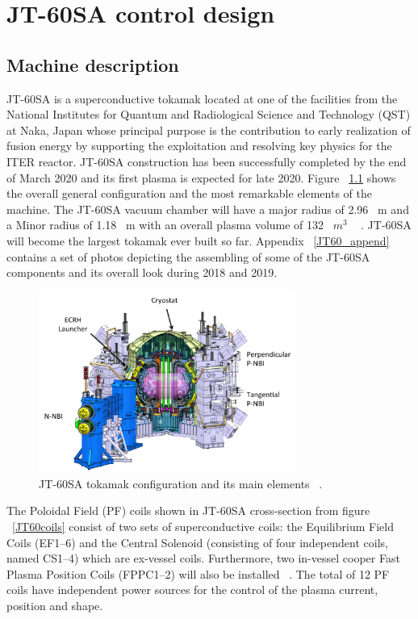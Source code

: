 \chapter{JT-60SA control design}

\section{Machine description}

JT-60SA is a superconductive tokamak located at one of the facilities from the National Institutes for Quantum and Radiological Science and Technology (QST)  at  Naka, Japan whose principal purpose is  the contribution to early realization of fusion energy by supporting the exploitation and resolving key physics for the ITER reactor.  JT-60SA construction has been successfully completed by the end of March 2020 and its first plasma is expected for late 2020. Figure ~\ref{JT60schm} shows the overall general configuration and the most remarkable elements of the machine. The JT-60SA  vacuum chamber will have a major radius of 2.96~ m and a Minor radius of 1.18~ m with an overall plasma volume of 132~ $m^3$ ~\cite{Spears2014} . JT-60SA will become the largest tokamak ever built so far. Appendix ~\ref{JT60_append} contains a set of photos depicting the assembling of some of the JT-60SA components and its overall look during 2018 and 2019. 
\smallskip

\begin{figure}[h]
	\centering
	\includegraphics[width=0.75\textwidth]{Chp3/JT60SA.png}
	
	\caption{\label{JT60schm}JT-60SA tokamak configuration and its main elements ~\cite{JT60SA:ResearchPlan}.}
\end{figure}

The Poloidal Field (PF) coils shown in JT-60SA cross-section from figure ~\ref{JT60coils} consist of two sets of superconductive coils: the Equilibrium Field Coils (EF1–6) and the Central Solenoid (consisting of four independent coils, named CS1–4) which are ex-vessel coils. Furthermore, two in-vessel cooper Fast Plasma Position  Coils (FPPC1–2) will also be installed ~\cite{NCruz}. The total of 12 PF coils have independent power sources for the control of the plasma current, position and shape.   
\smallskip

